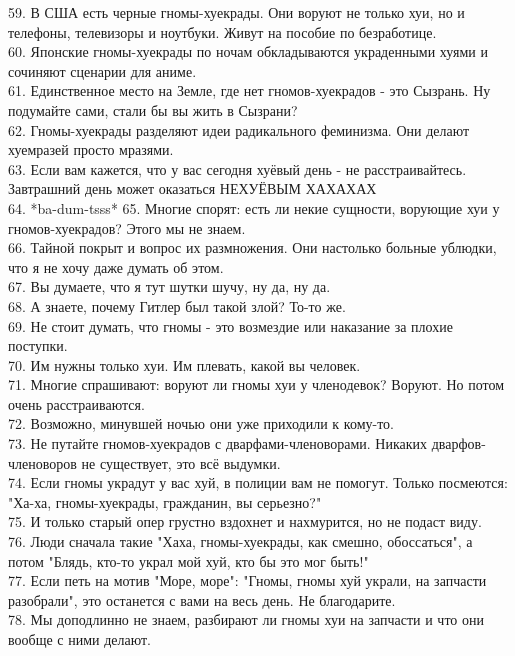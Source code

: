 \documentclass[a4paper,20pt,notitlepage]{extbook}
\begin{document}
	59. В США есть черные гномы-хуекрады. Они воруют не только хуи, но и телефоны, телевизоры и ноутбуки. Живут на пособие по безработице.\\
	60. Японские гномы-хуекрады по ночам обкладываются украденными хуями и сочиняют сценарии для аниме.\\
	61. Единственное место на Земле, где нет гномов-хуекрадов - это Сызрань. Ну подумайте сами, стали бы вы жить в Сызрани?\\
	62. Гномы-хуекрады разделяют идеи радикального феминизма. Они делают хуемразей просто мразями.\\
	63. Если вам кажется, что у вас сегодня хуёвый день - не расстраивайтесь. Завтрашний день может оказаться НЕХУЁВЫМ ХАХАХАХ\\
	64. *ba-dum-tsss*
	65. Многие спорят: есть ли некие сущности, ворующие хуи у гномов-хуекрадов? Этого мы не знаем.\\
	66. Тайной покрыт и вопрос их размножения. Они настолько больные ублюдки, что я не хочу даже думать об этом.\\
	67. Вы думаете, что я тут шутки шучу, ну да, ну да.\\
	68. А знаете, почему Гитлер был такой злой? То-то же.\\
	69. Не стоит думать, что гномы - это возмездие или наказание за плохие поступки.\\
	70. Им нужны только хуи. Им плевать, какой вы человек.\\
	71. Многие спрашивают: воруют ли гномы хуи у членодевок? Воруют. Но потом очень расстраиваются.\\
	72. Возможно, минувшей ночью они уже приходили к кому-то.\\
	73. Не путайте гномов-хуекрадов с дварфами-членоворами. Никаких дварфов-членоворов не существует, это всё выдумки.\\
	74. Если гномы украдут у вас хуй, в полиции вам не помогут. Только посмеются: "Ха-ха, гномы-хуекрады, гражданин, вы серьезно?"\\
	75. И только старый опер грустно вздохнет и нахмурится, но не подаст виду.\\
	76. Люди сначала такие "Хаха, гномы-хуекрады, как смешно, обоссаться", а потом "Блядь, кто-то украл мой хуй, кто бы это мог быть!"\\
	77. Если петь на мотив "Море, море": "Гномы, гномы хуй украли, на запчасти разобрали", это останется с вами на весь день. Не благодарите.\\
	78. Мы доподлинно не знаем, разбирают ли гномы хуи на запчасти и что они вообще с ними делают.\\
\end{document}
